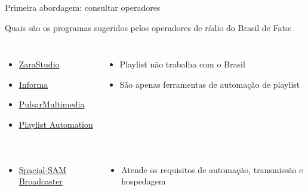 \begin{frame}{Primeira abordagem: consultar operadores}

Quais são os programas sugeridos pelos operadores de rádio do Brasil de
Fato:

\begin{columns}


\begin{itemize}
\tightlist
\item
  \href{https://www.zarastudio.es/}{ZaraStudio}
\item
  \href{http://informabr.com/}{Informa}
\item
  \href{http://www.pulsarmultimedia.com.br/}{PulsarMultimedia}
\item
  \href{http://playlistsolutions.com/?lang=en}{Playlist Automation}
\end{itemize}

\hrulefill

\pause


\begin{itemize}
\tightlist
\item
  Playlist não trabalha com o Brasil
\item
  São apenas ferramentas de automação de playlist
\end{itemize}

\end{columns}

\pause

\begin{columns}


\begin{itemize}
\tightlist
\item
  \href{https://spacial.com/pricing/}{Spacial-SAM Broadcaster}
\end{itemize}

\pause


\begin{itemize}
\tightlist
\item
  Atende os requisitos de automação, transmissão e hospedagem
\end{itemize}

\end{columns}

\end{frame}

